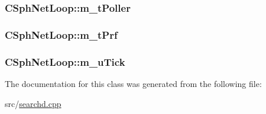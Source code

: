 \hypertarget{classCSphNetLoop_a15ed08f689873d6f9fa79ce8c0cb8fc7}{
\subsubsection[{m\-\_\-t\-Poller}]{ C\-Sph\-Net\-Loop\-::m\-\_\-t\-Poller\hspace{0.3cm}{\ttfamily [private]}}}\label{classCSphNetLoop_a15ed08f689873d6f9fa79ce8c0cb8fc7}
\hypertarget{classCSphNetLoop_a1d9f3234aaa76cf5121f0ceb12b47974}{
\subsubsection[{m\-\_\-t\-Prf}]{ C\-Sph\-Net\-Loop\-::m\-\_\-t\-Prf\hspace{0.3cm}{\ttfamily [private]}}}\label{classCSphNetLoop_a1d9f3234aaa76cf5121f0ceb12b47974}
\hypertarget{classCSphNetLoop_af12e17a09dcd10377cfa6010295981ac}{
\subsubsection[{m\-\_\-u\-Tick}]{ C\-Sph\-Net\-Loop\-::m\-\_\-u\-Tick}}\label{classCSphNetLoop_af12e17a09dcd10377cfa6010295981ac}


The documentation for this class was generated from the following file\-:\begin{DoxyCompactItemize}
\item 
src/\hyperlink{searchd_8cpp}{searchd.\-cpp}\end{DoxyCompactItemize}
